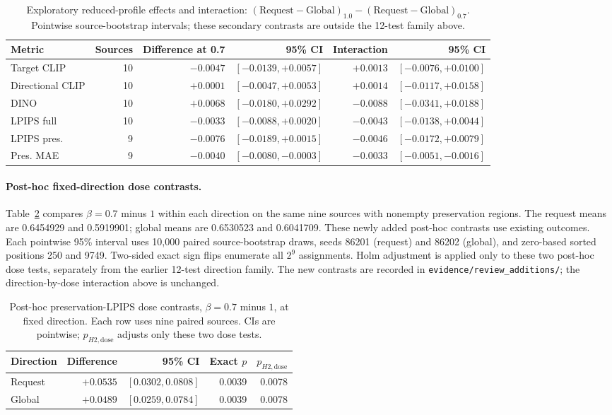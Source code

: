 \begin{table}[t]
\centering\small
\caption{Exploratory reduced-profile effects and interaction: $(\mathrm{Request}-\mathrm{Global})_{1.0}-(\mathrm{Request}-\mathrm{Global})_{0.7}$. Pointwise source-bootstrap intervals; these secondary contrasts are outside the 12-test family above.}
\label{tab:r86-secondary}
\begin{tabular}{lrrrrr}
\toprule
Metric & Sources & Difference at 0.7 & 95\% CI & Interaction & 95\% CI\\
\midrule
Target CLIP & 10 & $-0.0047$ & $[-0.0139,+0.0057]$ & $+0.0013$ & $[-0.0076,+0.0100]$\\
Directional CLIP & 10 & $+0.0001$ & $[-0.0047,+0.0053]$ & $+0.0014$ & $[-0.0117,+0.0158]$\\
DINO & 10 & $+0.0068$ & $[-0.0180,+0.0292]$ & $-0.0088$ & $[-0.0341,+0.0188]$\\
LPIPS full & 10 & $-0.0033$ & $[-0.0088,+0.0020]$ & $-0.0043$ & $[-0.0138,+0.0044]$\\
LPIPS pres. & 9 & $-0.0076$ & $[-0.0189,+0.0015]$ & $-0.0046$ & $[-0.0172,+0.0079]$\\
Pres. MAE & 9 & $-0.0040$ & $[-0.0080,-0.0003]$ & $-0.0033$ & $[-0.0051,-0.0016]$\\
\bottomrule\end{tabular}\end{table}

\paragraph{Post-hoc fixed-direction dose contrasts.}
Table~\ref{tab:r86-dose-paired} compares $\beta=0.7$ minus $1$ within each direction on the same nine sources with nonempty preservation regions. The request means are 0.6454929 and 0.5919901; global means are 0.6530523 and 0.6041709. These newly added post-hoc contrasts use existing outcomes. Each pointwise 95\% interval uses 10,000 paired source-bootstrap draws, seeds 86201 (request) and 86202 (global), and zero-based sorted positions 250 and 9749. Two-sided exact sign flips enumerate all $2^9$ assignments. Holm adjustment is applied only to these two post-hoc dose tests, separately from the earlier 12-test direction family. The new contrasts are recorded in \texttt{evidence/review\_additions/}; the direction-by-dose interaction above is unchanged.

\begin{table}[t]
\centering\small
\caption{Post-hoc preservation-LPIPS dose contrasts, $\beta=0.7$ minus $1$, at fixed direction. Each row uses nine paired sources. CIs are pointwise; $p_{H2,\mathrm{dose}}$ adjusts only these two dose tests.}
\label{tab:r86-dose-paired}
\begin{tabular}{lrrrr}
\toprule
Direction & Difference & 95\% CI & Exact $p$ & $p_{H2,\mathrm{dose}}$\\
\midrule
Request & $+0.0535$ & $[0.0302,0.0808]$ & 0.0039 & 0.0078\\
Global & $+0.0489$ & $[0.0259,0.0784]$ & 0.0039 & 0.0078\\
\bottomrule
\end{tabular}
\end{table}


